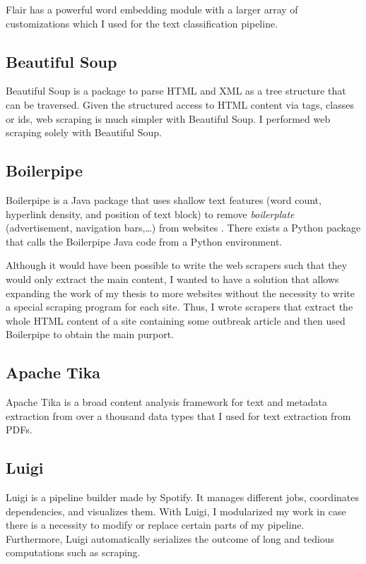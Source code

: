   Flair has a powerful word embedding module with a larger array of customizations which I used for the text classification pipeline.

\subsection{Beautiful Soup}
  Beautiful Soup is a package to parse HTML and XML as a tree structure that can be traversed.
  Given the structured access to HTML content via tags, classes or ids, web scraping is much simpler with Beautiful Soup.
  I performed web scraping solely with Beautiful Soup.

\subsection{Boilerpipe}
  Boilerpipe is a Java package that uses shallow text features (word count, hyperlink density, and position of text block) to remove \emph{boilerplate} (advertisement, navigation bars,\dots) from websites \citep{Kohlschutter2010}.
  There exists a Python package that calls the Boilerpipe Java code from a Python environment.

  Although it would have been possible to write the web scrapers such that they would only extract the main content, I wanted to have a solution that allows expanding the work of my thesis to more websites without the necessity to write a special scraping program for each site.
  Thus, I wrote scrapers that extract the whole HTML content of a site containing some outbreak article and then used Boilerpipe to obtain the main purport.

\subsection{Apache Tika}\label{Tika}
  Apache Tika is a broad content analysis framework for text and metadata extraction from over a thousand data types that I used for text extraction from PDFs.

\subsection{Luigi}
  Luigi is a pipeline builder made by Spotify.
  It manages different jobs, coordinates dependencies, and visualizes them.
  With Luigi, I modularized my work in case there is a necessity to modify or replace certain parts of my pipeline. Furthermore, Luigi automatically serializes the outcome of long and tedious computations such as scraping.

